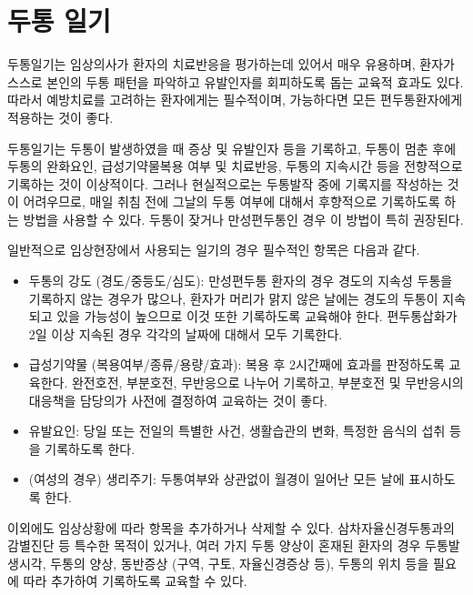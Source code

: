 \documentclass[]{book}
\begin{document}
\cleardoublepage

\hypertarget{appendix-appendix}{%
\appendix}


\hypertarget{section-22}{%
\chapter{두통 일기}\label{section-22}}

두통일기는 임상의사가 환자의 치료반응을 평가하는데 있어서 매우 유용하며, 환자가 스스로 본인의 두통 패턴을 파악하고 유발인자를 회피하도록 돕는 교육적 효과도 있다. 따라서 예방치료를 고려하는 환자에게는 필수적이며, 가능하다면 모든 편두통환자에게 적용하는 것이 좋다.

두통일기는 두통이 발생하였을 때 증상 및 유발인자 등을 기록하고, 두통이 멈춘 후에 두통의 완화요인, 급성기약물복용 여부 및 치료반응, 두통의 지속시간 등을 전향적으로 기록하는 것이 이상적이다. 그러나 현실적으로는 두통발작 중에 기록지를 작성하는 것이 어려우므로, 매일 취침 전에 그날의 두통 여부에 대해서 후향적으로 기록하도록 하는 방법을 사용할 수 있다. 두통이 잦거나 만성편두통인 경우 이 방법이 특히 권장된다.

일반적으로 임상현장에서 사용되는 일기의 경우 필수적인 항목은 다음과 같다.

\begin{itemize}
\item
  두통의 강도 (경도/중등도/심도): 만성편두통 환자의 경우 경도의 지속성 두통을 기록하지 않는 경우가 많으나, 환자가 머리가 맑지 않은 날에는 경도의 두통이 지속되고 있을 가능성이 높으므로 이것 또한 기록하도록 교육해야 한다. 편두통삽화가 2일 이상 지속된 경우 각각의 날짜에 대해서 모두 기록한다.
\item
  급성기약물 (복용여부/종류/용량/효과): 복용 후 2시간째에 효과를 판정하도록 교육한다. 완전호전, 부분호전, 무반응으로 나누어 기록하고, 부분호전 및 무반응시의 대응책을 담당의가 사전에 결정하여 교육하는 것이 좋다.
\item
  유발요인: 당일 또는 전일의 특별한 사건, 생활습관의 변화, 특정한 음식의 섭취 등을 기록하도록 한다.
\item
  (여성의 경우) 생리주기: 두통여부와 상관없이 월경이 일어난 모든 날에 표시하도록 한다.
\end{itemize}

이외에도 임상상황에 따라 항목을 추가하거나 삭제할 수 있다. 삼차자율신경두통과의 감별진단 등 특수한 목적이 있거나, 여러 가지 두통 양상이 혼재된 환자의 경우 두통발생시각, 두통의 양상, 동반증상 (구역, 구토, 자율신경증상 등), 두통의 위치 등을 필요에 따라 추가하여 기록하도록 교육할 수 있다.
\end{document}
